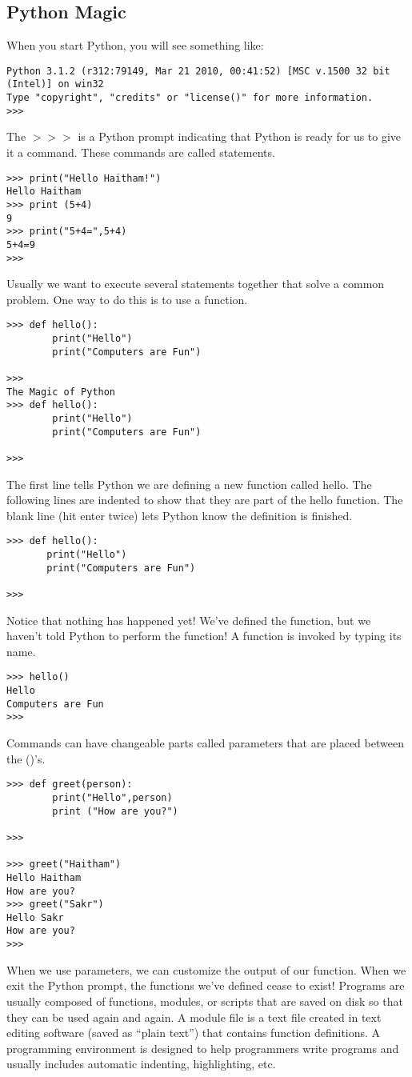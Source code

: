 \documentclass[12pt,a4paper,final,twoside,onecolumn,titlepage]{book}
\begin{document}
\subsection{Python Magic}
When you start Python, you will see something like:
\lstset{language=Python, tabsize=4}
\begin{lstlisting}
Python 3.1.2 (r312:79149, Mar 21 2010, 00:41:52) [MSC v.1500 32 bit (Intel)] on win32
Type "copyright", "credits" or "license()" for more information.
>>> 
\end{lstlisting}
The $>>>$ is a Python prompt indicating that Python is ready for us to give it a command. These commands are called statements.
\lstset{language=Python, tabsize=4}
\begin{lstlisting}
>>> print("Hello Haitham!")
Hello Haitham
>>> print (5+4)
9
>>> print("5+4=",5+4)
5+4=9
>>>
\end{lstlisting}
Usually we want to execute several statements together that solve a common problem. One way to do this is to use a function.
\lstset{language=Python, tabsize=4}
\begin{lstlisting}
>>> def hello():
	    print("Hello") 
	    print("Computers are Fun") 
	    	
>>> 
The Magic of Python
>>> def hello():
	    print("Hello") 
	    print("Computers are Fun") 

>>>
\end{lstlisting}
The first line tells Python we are defining a new function called hello. The following lines are indented to show that they are part of the hello function. The blank line (hit enter twice) lets Python know the definition is finished.
\lstset{language=Python, tabsize=4}
\begin{lstlisting}
>>> def hello():
	   print("Hello")
	   print("Computers are Fun") 
	
>>>
\end{lstlisting}
Notice that nothing has happened yet! We’ve defined the function, but we haven’t told Python to perform the function! A function is invoked by typing its name.
\lstset{language=Python, tabsize=4}
\begin{lstlisting}
>>> hello()
Hello
Computers are Fun
>>> 
\end{lstlisting}
Commands can have changeable parts called parameters that are placed between the ()’s.
\lstset{language=Python, tabsize=4}
\begin{lstlisting}
>>> def greet(person):
	    print("Hello",person)
	    print ("How are you?")
	
>>> 

>>> greet("Haitham")
Hello Haitham
How are you?
>>> greet("Sakr")
Hello Sakr
How are you?
>>>  
\end{lstlisting}
When we use parameters, we can customize the output of our function. When we exit the Python prompt, the functions we’ve defined cease to exist! Programs are usually composed of functions, modules, or scripts that are saved on disk so that they can be used again and again. A module file is a text file created in text editing software (saved as “plain text”) that contains function definitions. A programming environment is designed to help programmers write programs and usually includes automatic indenting, highlighting, etc.
\end{document}
